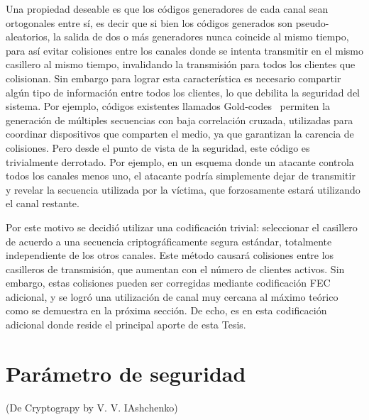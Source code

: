 Una propiedad deseable es que los códigos generadores de cada canal sean ortogonales entre sí, es decir que si bien los códigos generados son pseudo-aleatorios, la salida de dos o más generadores nunca coincide al mismo tiempo, para así evitar colisiones entre los canales donde se intenta transmitir en el mismo casillero al mismo tiempo, invalidando la transmisión para todos los clientes que colisionan.
Sin embargo para lograr esta característica es necesario compartir algún tipo de información entre todos los clientes, lo que debilita la seguridad del sistema. Por ejemplo, códigos existentes llamados Gold-codes~\cite{gold1967optimal} permiten la generación de múltiples secuencias con baja correlación cruzada, utilizadas para coordinar dispositivos que comparten el medio, ya que garantizan la carencia de colisiones. Pero desde el punto de vista de la seguridad, este código es trivialmente derrotado. Por ejemplo, en un esquema donde un atacante controla todos los canales menos uno, el atacante podría simplemente dejar de transmitir y revelar la secuencia utilizada por la víctima, que forzosamente estará utilizando el canal restante.

Por este motivo se decidió utilizar una codificación trivial: seleccionar el casillero de acuerdo a una secuencia criptográficamente segura estándar, totalmente independiente de los otros canales. Este método causará colisiones entre los casilleros de transmisión, que aumentan con el número de clientes activos. Sin embargo, estas colisiones pueden ser corregidas mediante codificación FEC adicional, y se logró una utilización de canal muy cercana al máximo teórico como se demuestra en la próxima sección. De echo, es en esta codificación adicional donde reside el principal aporte de esta Tesis.

\section{Parámetro de seguridad}
(De Cryptograpy by V. V. IAshchenko)\cite{primes}

